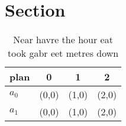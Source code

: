 \documentclass[a4paper]{article}
\begin{document}
\section{Section}

\begin{table}
\begin{adjustbox}{width=0.6\columnwidth}
\begin{tabular}{|l|l|l|l|}
\hline
\textbf{plan} & \multicolumn{1}{c|}{\textbf{0}} & \multicolumn{1}{c|}{\textbf{1}} & \multicolumn{1}{c|}{\textbf{2}} \\ \hline
\textbf{$a_0$}  & (0,0) & (1,0) & (2,0) \\ \hline
\textbf{$a_1$}  & (0,0) & (1,0) & (2,0) \\ \hline
\end{tabular}
\end{adjustbox}
\caption{Near havre the hour eat took gabr eet metres down
}
\end{table}
\end{document}

